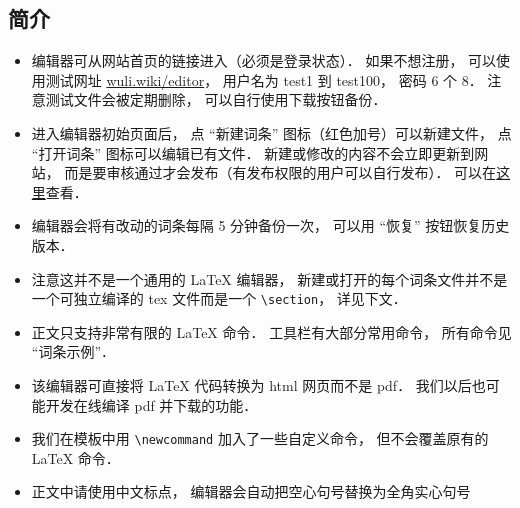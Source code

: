 
\subsection{简介}
\begin{itemize}
\item 编辑器可从网站首页的链接进入（必须是登录状态）． 如果不想注册， 可以使用测试网址 \href{http://wuli.wiki/editor}{wuli.wiki/editor}， 用户名为 test1 到 test100， 密码 6 个 8． 注意测试文件会被定期删除， 可以自行使用下载按钮备份．
\item 进入编辑器初始页面后， 点 “新建词条” 图标（红色加号）可以新建文件， 点 “打开词条” 图标可以编辑已有文件． 新建或修改的内容不会立即更新到网站， 而是要审核通过才会发布（有发布权限的用户可以自行发布）． 可以在\href{http://wuli.wiki/changed/changed.html}{这里}查看．
\item 编辑器会将有改动的词条每隔 5 分钟备份一次， 可以用 “恢复” 按钮恢复历史版本．
\item 注意这并不是一个通用的 LaTeX 编辑器， 新建或打开的每个词条文件并不是一个可独立编译的 tex 文件而是一个 \lstinline|\section|， 详见下文．
\item 正文只支持非常有限的 LaTeX 命令． 工具栏有大部分常用命令， 所有命令见 “词条示例”．
\item 该编辑器可直接将 LaTeX 代码转换为 html 网页而不是 pdf． 我们以后也可能开发在线编译 pdf 并下载的功能．
\item 我们在模板中用 \lstinline|\newcommand| 加入了一些自定义命令， 但不会覆盖原有的 LaTeX 命令．
\item 正文中请使用中文标点， 编辑器会自动把空心句号替换为全角实心句号
\end{itemize}

